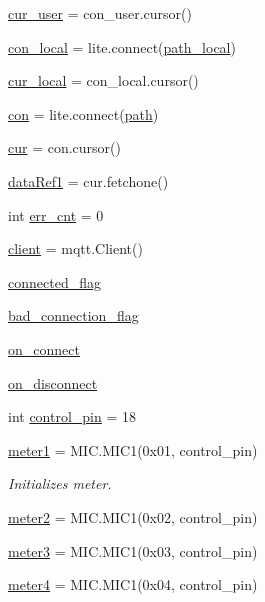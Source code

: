 \begin{DoxyCompactItemize}
\hyperlink{namespacemain3_aac45a371e86ea7af1ea340ec4e0f95a9}{cur\+\_\+user} = con\+\_\+user.\+cursor()
\item 
\hyperlink{namespacemain3_ac151e893e4ce2a34734073cf06c5f84a}{con\+\_\+local} = lite.\+connect(\hyperlink{namespacemain3_a8e2441fb4fc06f2788b1864358403339}{path\+\_\+local})
\item 
\hyperlink{namespacemain3_a25fd8974a655b4dc7bed362d3406bec3}{cur\+\_\+local} = con\+\_\+local.\+cursor()
\item 
\hyperlink{namespacemain3_a4a9ab88fdf3f5bfc0803104c30ddfc98}{con} = lite.\+connect(\hyperlink{namespacemain3_a94593883ff80bece1776244df08104a1}{path})
\item 
\hyperlink{namespacemain3_a4a9cd088c1387b19bfaa89ed31b577c2}{cur} = con.\+cursor()
\item 
\hyperlink{namespacemain3_a49b33cac6f362fbef2ac40a65b883fde}{data\+Ref1} = cur.\+fetchone()
\item 
int \hyperlink{namespacemain3_a7c241739211f5cb7ee0dcde96902c843}{err\+\_\+cnt} = 0
\item 
\hyperlink{namespacemain3_ac22ae978a8b5a446c25462949448abe9}{client} = mqtt.\+Client()
\item 
\hyperlink{namespacemain3_ad437a0de30e4b6dfc9d354c3d56e43ac}{connected\+\_\+flag}
\item 
\hyperlink{namespacemain3_ab4939f18edc72dec9e72dfa3ec2f026b}{bad\+\_\+connection\+\_\+flag}
\item 
\hyperlink{namespacemain3_a750e986d76cf0b4ce563501efc1d8f74}{on\+\_\+connect}
\item 
\hyperlink{namespacemain3_afecee61e71845eda2bab29e6c6d4f91c}{on\+\_\+disconnect}
\item 
int \hyperlink{namespacemain3_a71b20202aeb60b168b1dcee86f9d0d2a}{control\+\_\+pin} = 18
\item 
\hyperlink{namespacemain3_a6a802b14dd2a75c3e2b040097e50711a}{meter1} = M\+I\+C.\+M\+I\+C1(0x01, control\+\_\+pin)
\begin{DoxyCompactList}\small\item\em Initializes meter. \end{DoxyCompactList}\item 
\hyperlink{namespacemain3_aa252e5a293824baa2daad9b2dbef9b11}{meter2} = M\+I\+C.\+M\+I\+C1(0x02, control\+\_\+pin)
\item 
\hyperlink{namespacemain3_a70657f222edd8805f6f49ad404bd875a}{meter3} = M\+I\+C.\+M\+I\+C1(0x03, control\+\_\+pin)
\item 
\hyperlink{namespacemain3_a80e6d1df977908ba5ce55b4beb384ce6}{meter4} = M\+I\+C.\+M\+I\+C1(0x04, control\+\_\+pin)

\end{DoxyCompactItemize}
